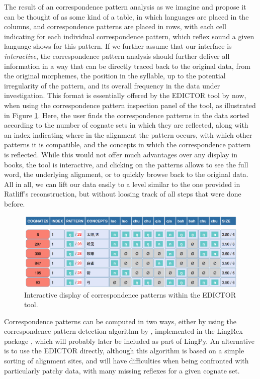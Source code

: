 \documentclass[xetex,svgnames]{scrartcl}
\begin{document}
The result of an correspondence pattern analysis as we imagine and propose it can be thought of as
some kind of a table, in which languages are placed in the columns, and correspondence patterns are
placed in rows, with each cell indicating for each individual correspondence pattern, which reflex
sound a given language shows for this pattern. If we further assume that our interface is
\emph{interactive}, the correspondence pattern analysis should further deliver all information in a
way that can be directly traced back to the original data, from the original morphemes, the position
in the syllable, up to the potential irregularity of the pattern, and its overall frequency in the
data under investigation. This format is essentially offered by the EDICTOR tool by now, when using
the correspondence pattern inspection panel of the tool, as illustrated in Figure \ref{fig:ede}.
Here, the user finds the correspondence patterns in the data sorted according to the number of
cognate sets in which they are reflected, along with an index indicating where in the alignment the
pattern occurs, with which other patterns it is compatible, and the concepts in which the
correspondence pattern is reflected. While this would not offer much advantages over any display in
books, the tool is interactive, and clicking on the patterns allows to see the full word, the
underlying alignment, or to quickly browse back to the original data. All in all, we can lift our
data easily to a level similar to the one provided in Ratliff's reconstruction, but without loosing
track of all steps that were done before.

\begin{figure}
  \centering
  \includegraphics[width=\textwidth]{edictor-hn.png}
  \caption{Interactive display of correspondence patterns within the EDICTOR tool.}
  \label{fig:ede}
\end{figure}
 
Correspondence patterns can be computed in two ways, either by using the correspondence pattern
detection algorithm by \citet{List2019a}, implemented in the LingRex package \citep{List2018j},
which will probably later be included as part of LingPy. An alternative is to use the EDICTOR
directly, although this algorithm is based on a simple sorting of alignment sites, and will have
difficulties when being confronted with particularly patchy data, with many missing reflexes for a
given cognate set.
 
\end{document}
